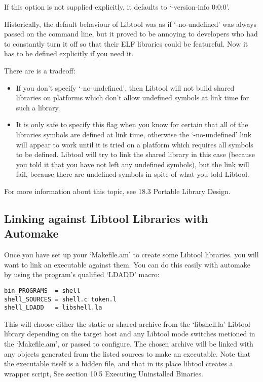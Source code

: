 If this option is not supplied explicitly, it defaults to `-version-info 0:0:0'. 


Historically, the default behaviour of Libtool was as if `-no-undefined' was always passed on the command line, but it proved to be annoying to developers who had to constantly turn it off so that their ELF libraries could be featureful. Now it has to be defined explicitly if you need it. 

There are is a tradeoff: 

\begin{itemize}

\item If you don't specify `-no-undefined', then Libtool will not build shared libraries on platforms which don't allow undefined symbols at link time for such a library. 

\item It is only safe to specify this flag when you know for certain that all of the libraries symbols are defined at link time, otherwise the `-no-undefined' link will appear to work until it is tried on a platform which requires all symbols to be defined. Libtool will try to link the shared library in this case (because you told it that you have not left any undefined symbols), but the link will fail, because there are undefined symbols in spite of what you told Libtool. 
\end{itemize}

For more information about this topic, see 18.3 Portable Library Design. 

\subsection{Linking against Libtool Libraries with Automake}


Once you have set up your `Makefile.am' to create some Libtool libraries. you will want to link an executable against them. You can do this easily with automake by using the program's qualified `LDADD' macro: 

\begin{Verbatim}[frame=single]
bin_PROGRAMS  = shell
shell_SOURCES = shell.c token.l
shell_LDADD   = libshell.la
\end{Verbatim}



 This will choose either the static or shared archive from the `libshell.la' Libtool library depending on the target host and any Libtool mode switches metioned in the `Makefile.am', or passed to configure. The chosen archive will be linked with any objects generated from the listed sources to make an executable. Note that the executable itself is a hidden file, and that in its place libtool creates a wrapper script, See section 10.5 Executing Uninstalled Binaries. 


